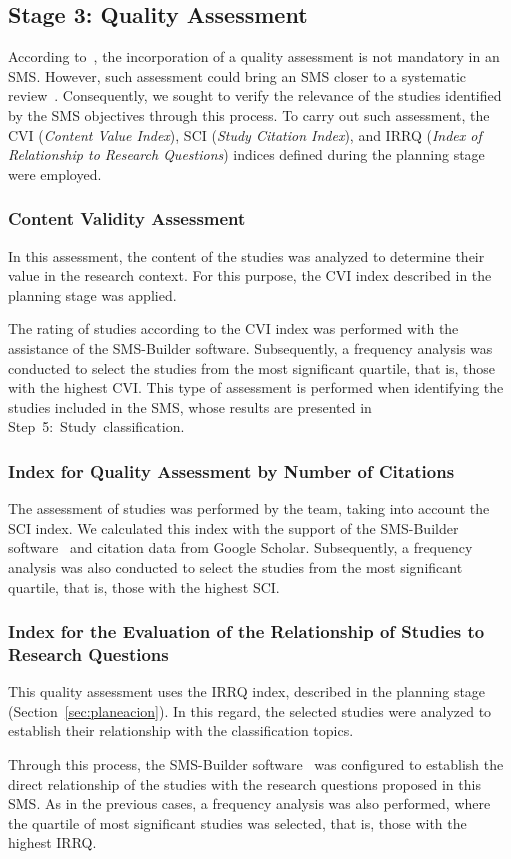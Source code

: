 \subsection{Stage 3: Quality Assessment}
According to~\cite{Ali-01}, the incorporation of a quality assessment is not mandatory in an SMS. However, such assessment could bring an SMS closer to a systematic review~\cite{Petersen-01}. Consequently, we sought to verify the relevance of the studies identified by the SMS objectives through this process. To carry out such assessment, the CVI (\textit{Content Value Index}), SCI (\textit{Study Citation Index}), and IRRQ (\textit{Index of Relationship to Research Questions}) indices defined during the planning stage were employed.

\subsubsection{Content Validity Assessment}
In this assessment, the content of the studies was analyzed to determine their value in the research context. For this purpose, the CVI index described in the planning stage was applied.

The rating of studies according to the CVI index was performed with the assistance of the SMS-Builder software. Subsequently, a frequency analysis was conducted to select the studies from the most significant quartile, that is, those with the highest CVI. This type of assessment is performed when identifying the \totalEtapaDos{} studies included in the SMS, whose results are presented in \hbox{Step 5: Study classification.}

\subsubsection{Index for Quality Assessment by Number of Citations}
The assessment of studies was performed by the team, taking into account the SCI index. We calculated this index with the support of the SMS-Builder software~\cite{sms-builder-repo} and citation data from Google Scholar. Subsequently, a frequency analysis was also conducted to select the studies from the most significant quartile, that is, those with the highest SCI.

\subsubsection{Index for the Evaluation of the Relationship of Studies to Research Questions}
This quality assessment uses the IRRQ index, described in the planning stage (Section~\ref{sec:planeacion}). In this regard, the selected studies were analyzed to establish their relationship with the classification topics.

Through this process, the SMS-Builder software~\cite{sms-builder-repo} was configured to establish the direct relationship of the studies with the research questions proposed in this SMS. As in the previous cases, a frequency analysis was also performed, where the quartile of most significant studies was selected, that is, those with the highest IRRQ.